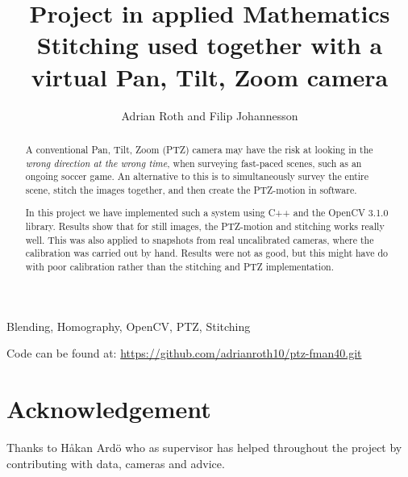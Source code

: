 \documentclass[10 pt, journal]{IEEEtran}
\title{Project in applied Mathematics \\
  \large Stitching used together with a virtual Pan, Tilt, Zoom camera}
\author{Adrian Roth and Filip Johannesson}
\begin{document}
\maketitle
\begin{abstract}
  A conventional Pan, Tilt, Zoom (PTZ) camera may have the risk at looking in the {\it wrong direction at the wrong time}, when surveying fast-paced scenes, such as an ongoing soccer game.
  An alternative to this is to simultaneously survey the entire scene, stitch the images together, and then create the PTZ-motion in software.

  In this project we have implemented such a system using C++ and the OpenCV 3.1.0 library.
  Results show that for still images, the PTZ-motion and stitching works really well.
  This was also applied to snapshots from real uncalibrated cameras, where the calibration was carried out by hand.
  Results were not as good, but this might have do with poor calibration rather than the stitching and PTZ implementation.
\end{abstract}
\begin{IEEEkeywords}
	Blending, Homography, OpenCV, PTZ, Stitching
\end{IEEEkeywords}
Code can be found at:
\url{https://github.com/adrianroth10/ptz-fman40.git}











\section{Acknowledgement}
Thanks to Håkan Ardö who as supervisor has helped throughout the project by contributing with data, cameras and advice.




\newpage


\end{document}
